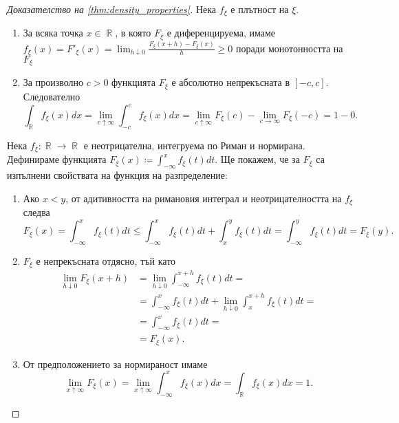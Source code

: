 \documentclass{../../common/topic}
\begin{document}
\begin{proof}[Доказателство на \cref{thm:density_properties}]
  \SufficiencySubProof Нека \( f_\xi \) е плътност на \( \xi \).
  \begin{enumerate}
    \item За всяка точка \( x \in \BbbR \), в която \( F_\xi \) е диференцируема, имаме \( f_\xi(x) = F'_\xi(x) = \lim_{h \downarrow 0} \frac {F_\xi(x + h) - F_\xi(x)} h \geq 0 \) поради монотонността на \( F_\xi \)
    \item За произволно \( c > 0 \) функцията \( F_\xi \) е абсолютно непрекъсната в \( [-c, c] \). Следователно
    \begin{equation*}
      \int_{\BbbR} f_\xi(x) dx
      =
      \lim_{c \uparrow \infty} \int_{-c}^c f_\xi(x) dx
      =
      \lim_{c \uparrow \infty} F_\xi(c) - \lim_{c \to \infty} F_\xi(-c)
      =
      1 - 0.
    \end{equation*}
  \end{enumerate}

  \NecessitySubProof Нека \( f_\xi: \BbbR \to \BbbR \) е неотрицателна, интегруема по Риман и нормирана. Дефинираме функцията \( F_\xi(x) \coloneqq \int_{-\infty}^x f_\xi(t) dt \). Ще покажем, че за \( F_\xi \) са изпълнени свойствата на функция на разпределение:
  \begin{enumerate}
    \item Ако \( x < y \), от адитивността на римановия интеграл и неотрицателността на \( f_\xi \) следва
    \begin{equation*}
      F_\xi(x)
      =
      \int_{-\infty}^x f_\xi(t) dt
      \leq
      \int_{-\infty}^x f_\xi(t) dt + \int_x^y f_\xi(t) dt
      =
      \int_{-\infty}^y f_\xi(t) dt
      =
      F_\xi(y).
    \end{equation*}

    \item \( F_\xi \) е непрекъсната отдясно, тъй като
    \begin{align*}
      \lim_{h \downarrow 0} F_\xi(x + h)
      &=
      \lim_{h \downarrow 0} \int_{-\infty}^{x + h} f_\xi(t) dt
      = \\ &=
      \int_{-\infty}^x f_\xi(t) dt + \lim_{h \downarrow 0} \int_x^{x + h} f_\xi(t) dt
      = \\ &=
      \int_{-\infty}^x f_\xi(t) dt
      = \\ &=
      F_\xi(x).
    \end{align*}

    \item От предположението за нормираност имаме
    \begin{equation*}
      \lim_{x \uparrow \infty} F_\xi(x)
      =
      \lim_{x \uparrow \infty} \int_{-\infty}^x f_\xi(x) dx
      =
      \int_{\BbbR} f_\xi(x) dx = 1.
    \end{equation*}


\end{enumerate}
\end{proof}
\end{document}
